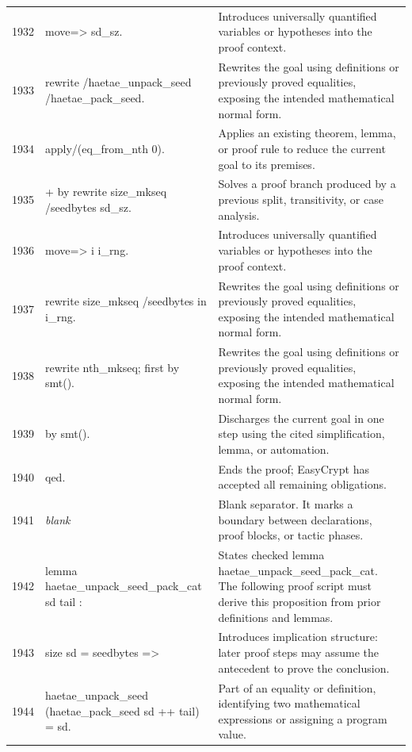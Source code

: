 \documentclass[10pt]{article}
\begin{document}
\begin{longtable}{r L{0.53\textwidth} L{0.37\textwidth}}
1932 & {\ttfamily\scriptsize move=> sd\_sz.} & Introduces universally quantified variables or hypotheses into the proof context. \\
1933 & {\ttfamily\scriptsize rewrite /haetae\_unpack\_seed /haetae\_pack\_seed.} & Rewrites the goal using definitions or previously proved equalities, exposing the intended mathematical normal form. \\
1934 & {\ttfamily\scriptsize apply/(eq\_from\_nth 0).} & Applies an existing theorem, lemma, or proof rule to reduce the current goal to its premises. \\
1935 & {\ttfamily\scriptsize + by rewrite size\_mkseq /seedbytes sd\_sz.} & Solves a proof branch produced by a previous split, transitivity, or case analysis. \\
1936 & {\ttfamily\scriptsize move=> i i\_rng.} & Introduces universally quantified variables or hypotheses into the proof context. \\
1937 & {\ttfamily\scriptsize rewrite size\_mkseq /seedbytes in i\_rng.} & Rewrites the goal using definitions or previously proved equalities, exposing the intended mathematical normal form. \\
1938 & {\ttfamily\scriptsize rewrite nth\_mkseq; first by smt().} & Rewrites the goal using definitions or previously proved equalities, exposing the intended mathematical normal form. \\
1939 & {\ttfamily\scriptsize by smt().} & Discharges the current goal in one step using the cited simplification, lemma, or automation. \\
1940 & {\ttfamily\scriptsize qed.} & Ends the proof; EasyCrypt has accepted all remaining obligations. \\
1941 & {\ttfamily\scriptsize \emph{blank}} & Blank separator.  It marks a boundary between declarations, proof blocks, or tactic phases. \\
1942 & {\ttfamily\scriptsize lemma haetae\_unpack\_seed\_pack\_cat sd tail :} & States checked lemma haetae\_unpack\_seed\_pack\_cat.  The following proof script must derive this proposition from prior definitions and lemmas. \\
1943 & {\ttfamily\scriptsize   size sd = seedbytes =>} & Introduces implication structure: later proof steps may assume the antecedent to prove the conclusion. \\
1944 & {\ttfamily\scriptsize   haetae\_unpack\_seed (haetae\_pack\_seed sd ++ tail) = sd.} & Part of an equality or definition, identifying two mathematical expressions or assigning a program value. \\

\end{longtable}
\end{document}
